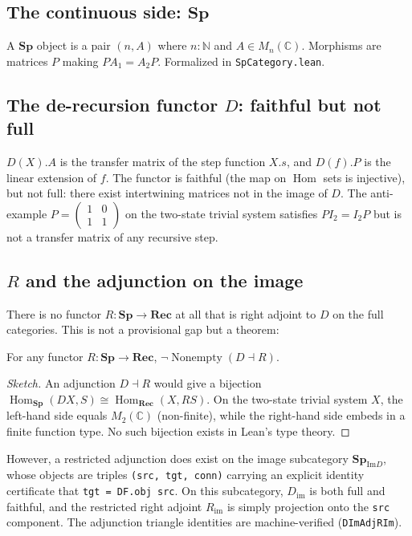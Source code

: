 \documentclass[11pt,twoside]{article}
\newcommand{\rec}{\mathbf{Rec}}
\newcommand{\spc}{\mathbf{Sp}}
\newcommand{\spimd}{\mathbf{Sp}_{\mathrm{Im}D}}
\newcommand{\DF}{\ensuremath{D}}
\newcommand{\RF}{\ensuremath{R}}
\newcommand{\Homt}{\operatorname{Hom}}
\begin{document}
\subsection{The continuous side: $\spc$}
A $\spc$ object is a pair $(n, A)$ where $n : \mathbb{N}$ and $A \in M_n(\mathbb{C})$. Morphisms are matrices $P$ making $PA_1 = A_2P$. Formalized in \texttt{SpCategory.lean}.

\subsection{The de-recursion functor $\DF$: faithful but not full}
$\DF(X).A$ is the transfer matrix of the step function $X.s$, and $\DF(f).P$ is the linear extension of $f$. The functor is faithful (the map on $\Homt$ sets is injective), but not full: there exist intertwining matrices not in the image of $\DF$. The anti-example $P = \begin{pmatrix}1&0\\1&1\end{pmatrix}$ on the two-state trivial system satisfies $PI_2 = I_2P$ but is not a transfer matrix of any recursive step.

\subsection{$\RF$ and the adjunction on the image}
There is no functor $\RF : \spc \to \rec$ at all that is right adjoint to $\DF$ on the full categories. This is not a provisional gap but a theorem:
\begin{theorem}
For any functor $\RF : \spc \to \rec$, $\neg \operatorname{Nonempty}(\DF \dashv \RF)$.
\end{theorem}
\begin{proof}[Sketch]
An adjunction $\DF \dashv \RF$ would give a bijection $\Homt_{\spc}(\DF X, S) \cong \Homt_{\rec}(X, \RF S)$. On the two-state trivial system $X$, the left-hand side equals $M_2(\mathbb{C})$ (non-finite), while the right-hand side embeds in a finite function type. No such bijection exists in Lean's type theory.
\end{proof}

However, a restricted adjunction does exist on the image subcategory $\spimd$, whose objects are triples \texttt{(src, tgt, conn)} carrying an explicit identity certificate that \texttt{tgt = DF.obj src}. On this subcategory, $D_{\mathrm{im}}$ is both full and faithful, and the restricted right adjoint $R_{\mathrm{im}}$ is simply projection onto the \texttt{src} component. The adjunction triangle identities are machine-verified (\texttt{DImAdjRIm}).
\end{document}
